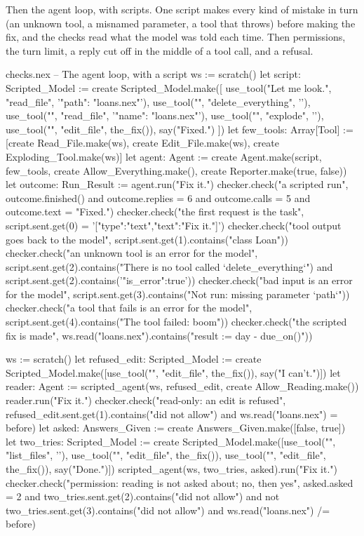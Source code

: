 Then the agent loop, with scripts. One script makes every kind of mistake
in turn (an unknown tool, a misnamed parameter, a tool that throws) before
making the fix, and the checks read what the model was told each time.
Then permissions, the turn limit, a reply cut off in the middle of a tool
call, and a refusal.

\begin{continued}{checks.nex}
-- The agent loop, with a script
ws := scratch()
let script: Scripted_Model := create Scripted_Model.make([
  use_tool("Let me look.", "read_file", '{"path": "loans.nex"}'),
  use_tool("", "delete_everything", '{}'),
  use_tool("", "read_file", '{"name": "loans.nex"}'),
  use_tool("", "explode", '{}'),
  use_tool("", "edit_file", the_fix()),
  say("Fixed.")
])
let few_tools: Array[Tool] := [create Read_File.make(ws), create Edit_File.make(ws),
  create Exploding_Tool.make(ws)]
let agent: Agent := create Agent.make(script, few_tools, create Allow_Everything.make(),
  create Reporter.make(true, false))
let outcome: Run_Result := agent.run("Fix it.")
checker.check("a scripted run", outcome.finished() and outcome.replies = 6 and outcome.calls = 5
  and outcome.text = "Fixed.")
checker.check("the first request is the task", script.sent.get(0) = '[{"type":"text","text":"Fix it."}]')
checker.check("tool output goes back to the model", script.sent.get(1).contains("class Loan"))
checker.check("an unknown tool is an error for the model",
  script.sent.get(2).contains("There is no tool called `delete_everything`") and script.sent.get(2).contains('"is_error":true'))
checker.check("bad input is an error for the model", script.sent.get(3).contains("Not run: missing parameter `path`"))
checker.check("a tool that fails is an error for the model", script.sent.get(4).contains("The tool failed: boom"))
checker.check("the scripted fix is made", ws.read("loans.nex").contains("result := day - due_on()\n"))

ws := scratch()
let refused_edit: Scripted_Model := create Scripted_Model.make([use_tool("", "edit_file", the_fix()), say("I can't.")])
let reader: Agent := scripted_agent(ws, refused_edit, create Allow_Reading.make())
reader.run("Fix it.")
checker.check("read-only: an edit is refused", refused_edit.sent.get(1).contains("did not allow")
  and ws.read("loans.nex") = before)
let asked: Answers_Given := create Answers_Given.make([false, true])
let two_tries: Scripted_Model := create Scripted_Model.make([use_tool("", "list_files", '{}'),
  use_tool("", "edit_file", the_fix()), use_tool("", "edit_file", the_fix()), say("Done.")])
scripted_agent(ws, two_tries, asked).run("Fix it.")
checker.check("permission: reading is not asked about; no, then yes", asked.asked = 2
  and two_tries.sent.get(2).contains("did not allow") and not two_tries.sent.get(3).contains("did not allow")
  and ws.read("loans.nex") /= before)


\end{continued}
